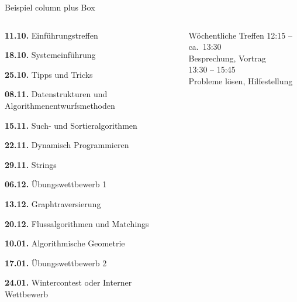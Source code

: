 \documentclass[aspectratio=169,xcolor=dvipsnames, t]{beamer}
\begin{document}
	
	\begin{frame}{Beispiel column plus Box}
		\vspace{-0.5cm}
		\begin{columns}
			\begin{column}{.65\linewidth}
				\begin{itemize}
					{\small
						\item { \bf 11.10.} Einf\"uhrungstreffen
						\item { \bf 18.10.} Systemeinf\"uhrung
						\item { \bf 25.10.} Tipps und Tricks
						\item { \bf 08.11.} Datenstrukturen und Algorithmenentwurfsmethoden
						\item { \bf 15.11.} Such- und Sortieralgorithmen
						\item { \bf 22.11.} Dynamisch Programmieren
						\item { \bf 29.11.} Strings
						\item { \bf 06.12.} \"Ubungswettbewerb 1
						\item { \bf 13.12.} Graphtraversierung
						\item { \bf 20.12.} Flussalgorithmen und Matchings
						\item { \bf 10.01.} Algorithmische Geometrie
						\item { \bf 17.01.} \"Ubungswettbewerb 2
						\item { \bf 24.01.} Wintercontest oder Interner Wettbewerb 
					}
				\end{itemize}
			\end{column}
			\begin{column}{.25\linewidth}
				\begin{block}{W\"ochentliche Treffen}
					12:15 -- ca.\ 13:30\\
					Besprechung, Vortrag\\
					13:30 -- 15:45\\
					Probleme l\"osen, Hilfestellung
				\end{block}
			\end{column}
		\end{columns}
		
	\end{frame}
\end{document}
